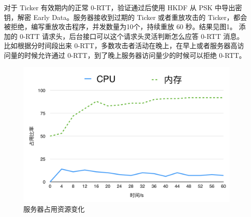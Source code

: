 对于 Ticker 有效期内的正常 0-RTT，验证通过后使用 HKDF 从 PSK 中导出密钥，解密 Early Data。服务器接收到过期的 Ticker 或者重放攻击的 Ticker，都会被拒绝，编写重放攻击程序，并发数量为10个，持续重放 60 秒。结果见图1。 添加的 0-RTT 请求头，后台接口可以这个请求头灵活判断怎么应答 0-RTT 消息。比如根据分时间段出来 0-RTT，多数攻击者活动在晚上，在早上或者服务器高访问量的时候允许通过 0-RTT，到了晚上服务器访问量少的时候可以拒绝 0-RTT。

\begin{figure}[ht]
	\centering
	\includegraphics[width=\linewidth]{./graphics/压力测试折线图.png}
	\caption{服务器占用资源变化}
\end{figure}

\newpage